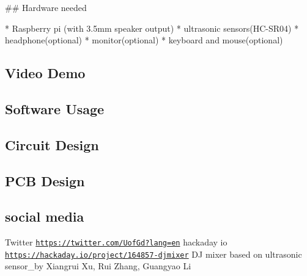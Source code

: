 \#\# Hardware needed 
\begin{DoxyCode}
* Raspberry pi (with 3.5mm speaker output)
* ultrasonic sensors(HC-SR04)
  * headphone(optional)
  * monitor(optional)
* keyboard and mouse(optional)
\end{DoxyCode}
 \subsection*{Video Demo}

\href{https://www.youtube.com/watch?v=7w9ATuSODwc}{\tt } \subsection*{Software Usage}

\subsection*{Circuit Design}

\subsection*{P\+CB Design}

\subsection*{social media}

Twitter \href{https://twitter.com/UofGd?lang=en}{\tt https\+://twitter.\+com/\+Uof\+Gd?lang=en} hackaday io \href{https://hackaday.io/project/164857-djmixer}{\tt https\+://hackaday.\+io/project/164857-\/djmixer} DJ mixer based on ultrasonic sensor\+\_\+by Xiangrui Xu, Rui Zhang, Guangyao Li 